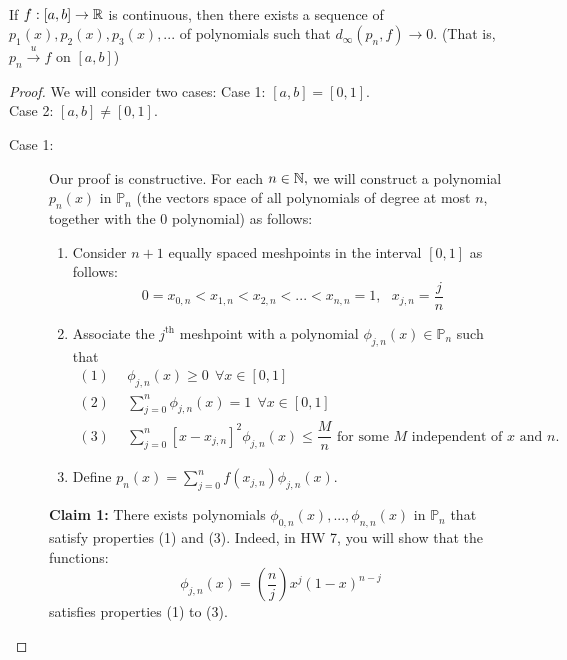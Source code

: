 \begin{theorem} \leavevmode \\
    \label{thm7.26}
    If $f:[a,b] \to \mathbb{R}$ is continuous, then there exists a sequence of $p_1(x), p_2(x), p_3(x),...$ of polynomials such that $d_\infty (p_n,f) \to 0$. (That is, $p_n \overset{u}{\to}f$ on $[a,b]$) 
\end{theorem}

\begin{proof}
    We will consider two cases:
    Case 1: $[a,b] = [0,1].$ \\ 
    Case 2: $[a,b] \neq [0,1].$

    \begin{description}
        \item[Case 1: ] Our proof is constructive. For each $n \in \mathbb{N},$ we will construct a polynomial $p_n(x)$ in $\mathbb{P}_n$ (the vectors space of all polynomials of degree at most $n$, together with the $0$ polynomial) as follows:
        \begin{enumerate}
            \item Consider $n+1$ equally spaced meshpoints in the interval $[0,1]$ as follows:
            $$0 = x_{0,n} < x_{1,n} < x_{2,n} < ... < x_{n,n} = 1, ~~~x_{j,n} = \frac{j}{n}$$

            \item Associate the $j^{\text{th}}$ meshpoint with a polynomial $\phi_{j,n}(x) \in \mathbb{P}_n$ such that
            \begin{align*}
                (1)& ~~\phi_{j,n}(x) \geq 0 ~~\forall x \in [0,1] \\
                (2)& ~~\sum_{j=0}^n \phi_{j,n}(x) = 1 ~~\forall x \in [0,1] \\
                (3)& ~~\sum_{j=0}^n\left[x-x_{j,n}\right]^2 \phi_{j,n}(x) \leq \dfrac{M}{n} \text{ for some $M$ independent of $x$ and $n$.}
            \end{align*}

            \item Define $p_n(x) = \sum_{j=0}^{n}f(x_{j,n})\phi_{j,n}(x).$
        \end{enumerate}
        \textbf{Claim 1: } There exists polynomials $\phi_{0,n}(x),...,\phi_{n,n}(x)$ in $\mathbb{P}_n$ that satisfy properties (1) and (3). Indeed, in HW 7, you will show that the functions:
        \[\phi_{j,n}(x) = \left(\frac{n}{j}\right)x^j(1-x)^{n-j}\]
        satisfies properties (1) to (3).
            

\end{description}
\end{proof}
